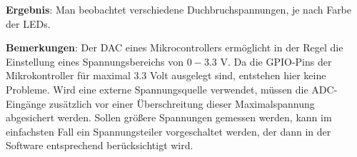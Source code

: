 \documentclass[../main.tex]{subfiles}
\begin{document}
\begin{tcolorbox}
    \vspace{0.5cm}
\textbf{Ergebnis}: Man beobachtet verschiedene Duchbruchspannungen, je nach Farbe der LEDs. 

\vspace{0.5cm}
\textbf{Bemerkungen}: Der DAC eines Mikrocontrollers ermöglicht in der Regel die Einstellung eines Spannungsbereichs von $0-3.3$ V. Da die GPIO-Pins der Mikrokontroller für maximal $3.3$ Volt ausgelegt sind, entstehen hier keine Probleme. Wird eine externe Spannungsquelle verwendet, müssen die ADC-Eingänge zusätzlich vor einer Überschreitung dieser Maximalspannung abgesichert werden. Sollen größere Spannungen gemessen werden, kann im einfachsten Fall ein Spannungsteiler vorgeschaltet werden, der dann in der Software entsprechend berücksichtigt wird.

\end{tcolorbox}
\end{document}
